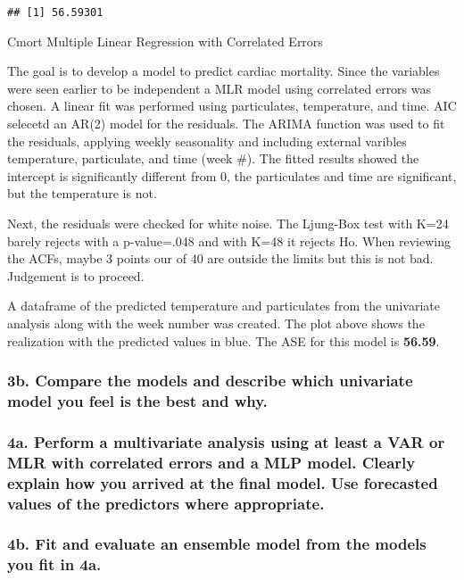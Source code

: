 \documentclass[]{article}
\begin{document}
\begin{verbatim}
## [1] 56.59301
\end{verbatim}

 Cmort Multiple Linear Regression with Correlated Errors

The goal is to develop a model to predict cardiac mortality. Since the
variables were seen earlier to be independent a MLR model using
correlated errors was chosen. A linear fit was performed using
particulates, temperature, and time. AIC selecetd an AR(2) model for the
residuals. The ARIMA function was used to fit the residuals, applying
weekly seasonality and including external varibles temperature,
particulate, and time (week \#). The fitted results showed the intercept
is significantly different from 0, the particulates and time are
significant, but the temperature is not.

Next, the residuals were checked for white noise. The Ljung-Box test
with K=24 barely rejects with a p-value=.048 and with K=48 it rejects
Ho. When reviewing the ACFs, maybe 3 points our of 40 are outside the
limits but this is not bad. Judgement is to proceed.

A dataframe of the predicted temperature and particulates from the
univariate analysis along with the week number was created. The plot
above shows the realization with the predicted values in blue. The ASE
for this model is \textbf{56.59}.

\subsubsection{3b. Compare the models and describe which univariate
model you feel is the best and
why.}\label{b.-compare-the-models-and-describe-which-univariate-model-you-feel-is-the-best-and-why.}

\subsubsection{4a. Perform a multivariate analysis using at least a VAR
or MLR with correlated errors and a MLP model. Clearly explain how you
arrived at the final model. Use forecasted values of the predictors
where
appropriate.}\label{a.-perform-a-multivariate-analysis-using-at-least-a-var-or-mlr-with-correlated-errors-and-a-mlp-model.-clearly-explain-how-you-arrived-at-the-final-model.-use-forecasted-values-of-the-predictors-where-appropriate.}

\subsubsection{4b. Fit and evaluate an ensemble model from the models
you fit in
4a.}\label{b.-fit-and-evaluate-an-ensemble-model-from-the-models-you-fit-in-4a.}
\end{document}
